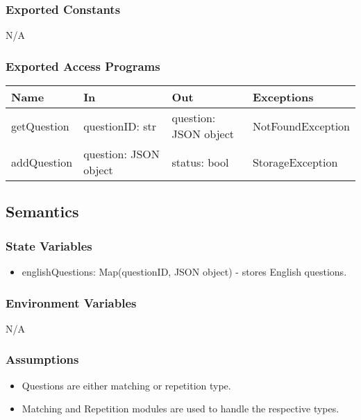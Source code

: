 \documentclass[12pt, titlepage]{article}
\begin{document}
\subsubsection{Exported Constants}

N/A

\subsubsection{Exported Access Programs}

\begin{center}
\begin{tabular}{p{3cm} p{4cm} p{4cm} p{5cm}}
\hline
\textbf{Name} & \textbf{In} & \textbf{Out} & \textbf{Exceptions} \\
\hline
getQuestion & \raggedright\arraybackslash questionID: str & \raggedright\arraybackslash question: JSON object & \raggedright\arraybackslash NotFoundException \\
\hline
addQuestion & \raggedright\arraybackslash question: JSON object & \raggedright\arraybackslash status: bool & \raggedright\arraybackslash StorageException \\
\hline
\end{tabular}
\end{center}

\subsection{Semantics}

\subsubsection{State Variables}

\begin{itemize}
  \item englishQuestions: Map(questionID, JSON object) - stores English questions.
\end{itemize}

\subsubsection{Environment Variables}

N/A

\subsubsection{Assumptions}

\begin{itemize}
  \item Questions are either matching or repetition type.
  \item Matching and Repetition modules are used to handle the respective types.
\end{itemize}
\end{document}
